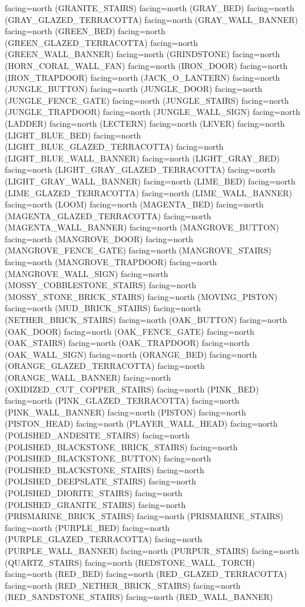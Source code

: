\documentclass[11pt]{article}
\begin{document}
facing=north (GRANITE_STAIRS)
facing=north (GRAY_BED)
facing=north (GRAY_GLAZED_TERRACOTTA)
facing=north (GRAY_WALL_BANNER)
facing=north (GREEN_BED)
facing=north (GREEN_GLAZED_TERRACOTTA)
facing=north (GREEN_WALL_BANNER)
facing=north (GRINDSTONE)
facing=north (HORN_CORAL_WALL_FAN)
facing=north (IRON_DOOR)
facing=north (IRON_TRAPDOOR)
facing=north (JACK_O_LANTERN)
facing=north (JUNGLE_BUTTON)
facing=north (JUNGLE_DOOR)
facing=north (JUNGLE_FENCE_GATE)
facing=north (JUNGLE_STAIRS)
facing=north (JUNGLE_TRAPDOOR)
facing=north (JUNGLE_WALL_SIGN)
facing=north (LADDER)
facing=north (LECTERN)
facing=north (LEVER)
facing=north (LIGHT_BLUE_BED)
facing=north (LIGHT_BLUE_GLAZED_TERRACOTTA)
facing=north (LIGHT_BLUE_WALL_BANNER)
facing=north (LIGHT_GRAY_BED)
facing=north (LIGHT_GRAY_GLAZED_TERRACOTTA)
facing=north (LIGHT_GRAY_WALL_BANNER)
facing=north (LIME_BED)
facing=north (LIME_GLAZED_TERRACOTTA)
facing=north (LIME_WALL_BANNER)
facing=north (LOOM)
facing=north (MAGENTA_BED)
facing=north (MAGENTA_GLAZED_TERRACOTTA)
facing=north (MAGENTA_WALL_BANNER)
facing=north (MANGROVE_BUTTON)
facing=north (MANGROVE_DOOR)
facing=north (MANGROVE_FENCE_GATE)
facing=north (MANGROVE_STAIRS)
facing=north (MANGROVE_TRAPDOOR)
facing=north (MANGROVE_WALL_SIGN)
facing=north (MOSSY_COBBLESTONE_STAIRS)
facing=north (MOSSY_STONE_BRICK_STAIRS)
facing=north (MOVING_PISTON)
facing=north (MUD_BRICK_STAIRS)
facing=north (NETHER_BRICK_STAIRS)
facing=north (OAK_BUTTON)
facing=north (OAK_DOOR)
facing=north (OAK_FENCE_GATE)
facing=north (OAK_STAIRS)
facing=north (OAK_TRAPDOOR)
facing=north (OAK_WALL_SIGN)
facing=north (ORANGE_BED)
facing=north (ORANGE_GLAZED_TERRACOTTA)
facing=north (ORANGE_WALL_BANNER)
facing=north (OXIDIZED_CUT_COPPER_STAIRS)
facing=north (PINK_BED)
facing=north (PINK_GLAZED_TERRACOTTA)
facing=north (PINK_WALL_BANNER)
facing=north (PISTON)
facing=north (PISTON_HEAD)
facing=north (PLAYER_WALL_HEAD)
facing=north (POLISHED_ANDESITE_STAIRS)
facing=north (POLISHED_BLACKSTONE_BRICK_STAIRS)
facing=north (POLISHED_BLACKSTONE_BUTTON)
facing=north (POLISHED_BLACKSTONE_STAIRS)
facing=north (POLISHED_DEEPSLATE_STAIRS)
facing=north (POLISHED_DIORITE_STAIRS)
facing=north (POLISHED_GRANITE_STAIRS)
facing=north (PRISMARINE_BRICK_STAIRS)
facing=north (PRISMARINE_STAIRS)
facing=north (PURPLE_BED)
facing=north (PURPLE_GLAZED_TERRACOTTA)
facing=north (PURPLE_WALL_BANNER)
facing=north (PURPUR_STAIRS)
facing=north (QUARTZ_STAIRS)
facing=north (REDSTONE_WALL_TORCH)
facing=north (RED_BED)
facing=north (RED_GLAZED_TERRACOTTA)
facing=north (RED_NETHER_BRICK_STAIRS)
facing=north (RED_SANDSTONE_STAIRS)
facing=north (RED_WALL_BANNER)
\end{document}
